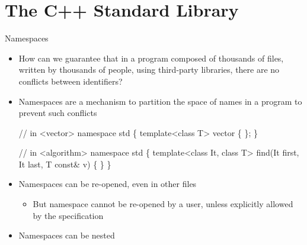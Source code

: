 

\section{The C++ Standard Library}

\begin{frame}[fragile]{Namespaces}

  \begin{itemize}
  \item<1-> How can we guarantee that in a program composed of thousands of files,
    written by thousands of people, using third-party libraries, there are no
    conflicts between identifiers?
  \item<2-> Namespaces are a mechanism to partition the space of names in a program
    to prevent such conflicts

    \begin{codeblock}
// in <vector>
\alert{namespace std \{}
  template<class T> vector \{ \ddd \};
\alert{\}}

// in <algorithm>
\alert{namespace std \{}
  template<class It, class T> find(It first, It last, T const& v) \{ \ddd \}
\alert{\}}\end{codeblock}

  \item<3-> Namespaces can be re-opened, even in other files
  \begin{itemize}
  \item But namespace  cannot be re-opened by a user, unless
    explicitly allowed by the specification
  \end{itemize}
  \item<4-> Namespaces can be nested
  \end{itemize}

\end{frame}

